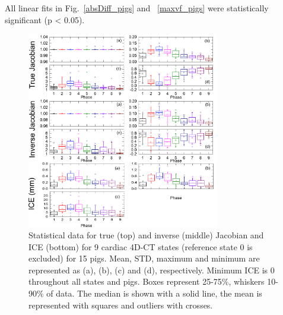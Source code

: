 All linear fits in Fig.~\ref{absDiff_pigs} and ~\ref{maxvf_pigs} were statistically significant (p < 0.05).



\newpage

\begin{figure}[H]
	\begin{center}		
		\includegraphics[width=0.75\textwidth]{./Vmm/Images/Jacobian_data_pigs.png}
		\caption{Statistical data for true (top) and inverse (middle) Jacobian and ICE (bottom) for 9 cardiac 4D-CT states (reference state 0 is excluded) for 15 pigs. Mean, STD, maximum and minimum are represented as (a), (b), (c) and (d), respectively.
		Minimum ICE is 0 throughout all states and pigs. Boxes represent 25-75\%, whiskers 10-90\%
		of data. The median is shown with a solid line, the mean is represented with squares and outliers with crosses.}
		\label{jacobian_data_pigs}
	\end{center}
\end{figure}

\newpage


